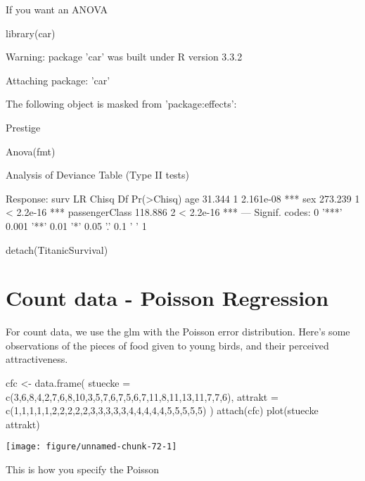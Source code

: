 \documentclass[a4paper,twoside]{tufte-book}\usepackage[]{graphicx}\usepackage[]{color}
\makeatletter
\def\maxwidth{ %
  \ifdim\Gin@nat@width>\linewidth
    \linewidth
  \else
    \Gin@nat@width
  \fi
}
\makeatother
\begin{document}
\begin{appendices}
If you want an ANOVA

\begin{Schunk}
\begin{Sinput}
library(car)
\end{Sinput}
\begin{Soutput}
Warning: package 'car' was built under R version 3.3.2
\end{Soutput}
\begin{Soutput}

Attaching package: 'car'
\end{Soutput}
\begin{Soutput}
The following object is masked from 'package:effects':

    Prestige
\end{Soutput}
\begin{Sinput}
Anova(fmt)
\end{Sinput}
\begin{Soutput}
Analysis of Deviance Table (Type II tests)

Response: surv
               LR Chisq Df Pr(>Chisq)    
age              31.344  1  2.161e-08 ***
sex             273.239  1  < 2.2e-16 ***
passengerClass  118.886  2  < 2.2e-16 ***
---
Signif. codes:  0 '***' 0.001 '**' 0.01 '*' 0.05 '.' 0.1 ' ' 1
\end{Soutput}
\begin{Sinput}
detach(TitanicSurvival)
\end{Sinput}
\end{Schunk}

\section{Count data - Poisson Regression}

For count data, we use the glm with the Poisson error distribution. Here's some observations of the pieces of food given to young birds, and their perceived attractiveness.

\begin{Schunk}
\begin{Sinput}
cfc <- data.frame(
  stuecke = c(3,6,8,4,2,7,6,8,10,3,5,7,6,7,5,6,7,11,8,11,13,11,7,7,6),
  attrakt = c(1,1,1,1,1,2,2,2,2,2,3,3,3,3,3,4,4,4,4,4,5,5,5,5,5) 
)
attach(cfc)
plot(stuecke ~ attrakt)
\end{Sinput}

\texttt{[image: figure/unnamed-chunk-72-1]} \end{Schunk}

This is how you specify the Poisson


\end{appendices}
\end{document}
